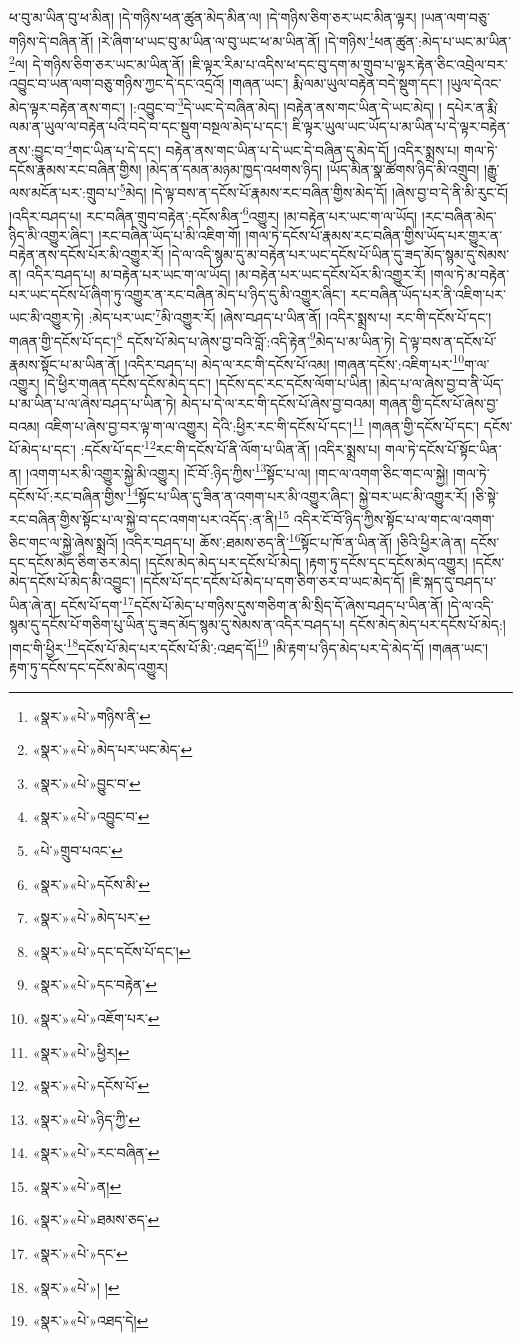 ཕ་བུ་མ་ཡིན་བུ་ཕ་མིན། །དེ་གཉིས་ཕན་ཚུན་མེད་མིན་ལ། །དེ་གཉིས་ཅིག་ཅར་ཡང་མིན་ལྟར། །ཡན་ལག་བཅུ་གཉིས་དེ་བཞིན་ནོ། །རེ་ཞིག་ཕ་ཡང་བུ་མ་ཡིན་ལ་བུ་ཡང་ཕ་མ་ཡིན་ནོ། །དེ་གཉིས་\footnote{«སྣར་»«པེ་»གཉིས་ནི་}ཕན་ཚུན་:མེད་པ་ཡང་མ་ཡིན་\footnote{«སྣར་»«པེ་»མེད་པར་ཡང་མེད་}ལ། དེ་གཉིས་ཅིག་ཅར་ཡང་མ་ཡིན་ནོ། །ཇི་ལྟར་རིམ་པ་འདིས་ཕ་དང་བུ་དག་མ་གྲུབ་པ་ལྟར་རྟེན་ཅིང་འབྲེལ་བར་འབྱུང་བ་ཡན་ལག་བཅུ་གཉིས་ཀྱང་དེ་དང་འདྲའོ། །གཞན་ཡང་། རྨི་ལམ་ཡུལ་བརྟེན་བདེ་སྡུག་དང་། །ཡུལ་དེའང་མེད་ལྟར་བརྟེན་ནས་གང་། །:འབྱུང་བ་\footnote{«སྣར་»«པེ་»བྱུང་བ་}དེ་ཡང་དེ་བཞིན་མེད། །བརྟེན་ནས་གང་ཡིན་དེ་ཡང་མེད། །
དཔེར་ན་རྨི་ལམ་ན་ཡུལ་ལ་བརྟེན་པའི་བདེ་བ་དང་སྡུག་བསྔལ་མེད་པ་དང་། ཇི་ལྟར་ཡུལ་ཡང་ཡོད་པ་མ་ཡིན་པ་དེ་ལྟར་བརྟེན་ནས་:བྱུང་བ་\footnote{«སྣར་»«པེ་»འབྱུང་བ་}གང་ཡིན་པ་དེ་དང་། བརྟེན་ནས་གང་ཡིན་པ་དེ་ཡང་དེ་བཞིན་དུ་མེད་དོ། །འདིར་སྨྲས་པ། གལ་ཏེ་དངོས་རྣམས་རང་བཞིན་གྱིས། །མེད་ན་དམན་མཉམ་ཁྱད་འཕགས་ཉིད། །ཡོད་མིན་སྣ་ཚོགས་ཉིད་མི་འགྲུབ། །རྒྱུ་ལས་མངོན་པར་:གྲུབ་པ་\footnote{«པེ་»གྲུབ་པའང་}མེད། །དེ་ལྟ་བས་ན་དངོས་པོ་རྣམས་རང་བཞིན་གྱིས་མེད་དོ། །ཞེས་བྱ་བ་དེ་ནི་མི་རུང་ངོ། །འདིར་བཤད་པ། རང་བཞིན་གྲུབ་བརྟེན་:དངོས་མིན་\footnote{«སྣར་»«པེ་»དངོས་མི་}འགྱུར། །མ་བརྟེན་པར་ཡང་ག་ལ་ཡོད། །རང་བཞིན་མེད་ཉིད་མི་འགྱུར་ཞིང་། །རང་བཞིན་ཡོད་པ་མི་འཇིག་གོ། །གལ་ཏེ་དངོས་པོ་རྣམས་རང་བཞིན་གྱིས་ཡོད་པར་གྱུར་ན་བརྟེན་ནས་དངོས་པོར་མི་འགྱུར་རོ། །དེ་ལ་འདི་སྙམ་དུ་མ་བརྟེན་པར་ཡང་དངོས་པོ་ཡིན་དུ་ཟད་མོད་སྙམ་དུ་སེམས་ན། འདིར་བཤད་པ། མ་བརྟེན་པར་ཡང་ག་ལ་ཡོད། །མ་བརྟེན་པར་ཡང་དངོས་པོར་མི་འགྱུར་རོ། །གལ་ཏེ་མ་བརྟེན་པར་ཡང་དངོས་པོ་ཞིག་ཏུ་འགྱུར་ན་རང་བཞིན་མེད་པ་ཉིད་དུ་མི་འགྱུར་ཞིང་། རང་བཞིན་ཡོད་པར་ནི་འཇིག་པར་ཡང་མི་འགྱུར་ཏེ། :མེད་པར་ཡང་\footnote{«སྣར་»«པེ་»མེད་པར་}མི་འགྱུར་རོ། །ཞེས་བཤད་པ་ཡིན་ནོ། །འདིར་སྨྲས་པ། རང་གི་དངོས་པོ་དང་། གཞན་གྱི་དངོས་པོ་དང་།\footnote{«སྣར་»«པེ་»དང་དངོས་པོ་དང་།} དངོས་པོ་མེད་པ་ཞེས་བྱ་བའི་བློ་:འདི་རྟེན་\footnote{«སྣར་»«པེ་»དང་བརྟེན་}མེད་པ་མ་ཡིན་ཏེ། དེ་ལྟ་བས་ན་དངོས་པོ་རྣམས་སྟོང་པ་མ་ཡིན་ནོ། །འདིར་བཤད་པ། མེད་ལ་རང་གི་དངོས་པོ་འམ། །གཞན་དངོས་:འཇིག་པར་\footnote{«སྣར་»«པེ་»འཇོག་པར་}ག་ལ་འགྱུར། །དེ་ཕྱིར་གཞན་དངོས་དངོས་མེད་དང་། །དངོས་དང་རང་དངོས་ལོག་པ་ཡིན། །མེད་པ་ལ་ཞེས་བྱ་བ་ནི་ཡོད་པ་མ་ཡིན་པ་ལ་ཞེས་བཤད་པ་ཡིན་ཏེ། མེད་པ་དེ་ལ་རང་གི་དངོས་པོ་ཞེས་བྱ་བའམ། གཞན་གྱི་དངོས་པོ་ཞེས་བྱ་བའམ། འཇིག་པ་ཞེས་བྱ་བར་ལྟ་ག་ལ་འགྱུར། དེའི་:ཕྱིར་རང་གི་དངོས་པོ་དང་།\footnote{«སྣར་»«པེ་»ཕྱིར།} །གཞན་གྱི་དངོས་པོ་དང་། དངོས་པོ་མེད་པ་དང་། :དངོས་པོ་དང་\footnote{«སྣར་»«པེ་»དངོས་པོ་}རང་གི་དངོས་པོ་ནི་ལོག་པ་ཡིན་ནོ། །འདིར་སྨྲས་པ། གལ་ཏེ་དངོས་པོ་སྟོང་ཡིན་ན། །འགག་པར་མི་འགྱུར་སྐྱེ་མི་འགྱུར། །ངོ་བོ་:ཉིད་ཀྱིས་\footnote{«སྣར་»«པེ་»ཉིད་ཀྱི་}སྟོང་པ་ལ། །གང་ལ་འགག་ཅིང་གང་ལ་སྐྱེ། །གལ་ཏེ་དངོས་པོ་:རང་བཞིན་གྱིས་\footnote{«སྣར་»«པེ་»རང་བཞིན་}སྟོང་པ་ཡིན་དུ་ཟིན་ན་འགག་པར་མི་འགྱུར་ཞིང་། སྐྱེ་བར་ཡང་མི་འགྱུར་རོ། །ཅི་སྟེ་རང་བཞིན་གྱིས་སྟོང་པ་ལ་སྐྱེ་བ་དང་འགག་པར་འདོད་:ན་ནི།\footnote{«སྣར་»«པེ་»ན།} འདིར་ངོ་བོ་ཉིད་ཀྱིས་སྟོང་པ་ལ་གང་ལ་འགག་ཅིང་གང་ལ་སྐྱེ་ཞེས་སྨྲའོ། །འདིར་བཤད་པ། ཆོས་:ཐམས་ཅད་ནི་\footnote{«སྣར་»«པེ་»ཐམས་ཅད་}སྟོང་པ་ཁོ་ན་ཡིན་ནོ། །ཅིའི་ཕྱིར་ཞེ་ན། དངོས་དང་དངོས་མེད་ཅིག་ཅར་མེད། །དངོས་མེད་མེད་པར་དངོས་པོ་མེད། །རྟག་ཏུ་དངོས་དང་དངོས་མེད་འགྱུར། །དངོས་མེད་དངོས་པོ་མེད་མི་འབྱུང་། །དངོས་པོ་དང་དངོས་པོ་མེད་པ་དག་ཅིག་ཅར་བ་ཡང་མེད་དོ། །ཇི་སྐད་དུ་བཤད་པ་ཡིན་ཞེ་ན། དངོས་པོ་དག་\footnote{«སྣར་»«པེ་»དང་}དངོས་པོ་མེད་པ་གཉིས་དུས་གཅིག་ན་མི་སྲིད་དོ་ཞེས་བཤད་པ་ཡིན་ནོ། །དེ་ལ་འདི་སྙམ་དུ་དངོས་པོ་གཅིག་པུ་ཡིན་དུ་ཟད་མོད་སྙམ་དུ་སེམས་ན་འདིར་བཤད་པ། དངོས་མེད་མེད་པར་དངོས་པོ་མེད:། །གང་གི་ཕྱིར་\footnote{«སྣར་»«པེ་»། །}དངོས་པོ་མེད་པར་དངོས་པོ་མི་:འཐད་དོ།\footnote{«སྣར་»«པེ་»འཐད་དེ།} །མི་རྟག་པ་ཉིད་མེད་པར་དེ་མེད་དོ། །གཞན་ཡང་། རྟག་ཏུ་དངོས་དང་དངོས་མེད་འགྱུར། 